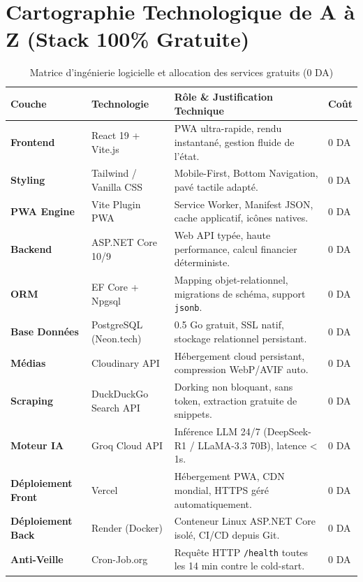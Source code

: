 \documentclass[11pt,a4paper]{article}
\begin{document}
\section{Cartographie Technologique de A à Z (Stack 100\% Gratuite)}

\begin{table}[h!]
\centering
\small
\renewcommand{\arraystretch}{1.3}
\begin{tabularx}{\textwidth}{l p{3.2cm} X l}
\toprule
\textbf{Couche} & \textbf{Technologie} & \textbf{Rôle \& Justification Technique} & \textbf{Coût} \\
\midrule
\textbf{Frontend} & React 19 + Vite.js & PWA ultra-rapide, rendu instantané, gestion fluide de l'état. & 0 DA \\
\textbf{Styling} & Tailwind / Vanilla CSS & Mobile-First, Bottom Navigation, pavé tactile adapté. & 0 DA \\
\textbf{PWA Engine} & Vite Plugin PWA & Service Worker, Manifest JSON, cache applicatif, icônes natives. & 0 DA \\
\textbf{Backend} & ASP.NET Core 10/9 & Web API typée, haute performance, calcul financier déterministe. & 0 DA \\
\textbf{ORM} & EF Core + Npgsql & Mapping objet-relationnel, migrations de schéma, support \texttt{jsonb}. & 0 DA \\
\textbf{Base Données} & PostgreSQL (Neon.tech) & 0.5 Go gratuit, SSL natif, stockage relationnel persistant. & 0 DA \\
\textbf{Médias} & Cloudinary API & Hébergement cloud persistant, compression WebP/AVIF auto. & 0 DA \\
\textbf{Scraping} & DuckDuckGo Search API & Dorking non bloquant, sans token, extraction gratuite de snippets. & 0 DA \\
\textbf{Moteur IA} & Groq Cloud API & Inférence LLM 24/7 (DeepSeek-R1 / LLaMA-3.3 70B), latence < 1s. & 0 DA \\
\textbf{Déploiement Front} & Vercel & Hébergement PWA, CDN mondial, HTTPS géré automatiquement. & 0 DA \\
\textbf{Déploiement Back} & Render (Docker) & Conteneur Linux ASP.NET Core isolé, CI/CD depuis Git. & 0 DA \\
\textbf{Anti-Veille} & Cron-Job.org & Requête HTTP \texttt{/health} toutes les 14 min contre le cold-start. & 0 DA \\
\bottomrule
\end{tabularx}
\caption{Matrice d'ingénierie logicielle et allocation des services gratuits (0 DA)}
\end{table}
\end{document}

